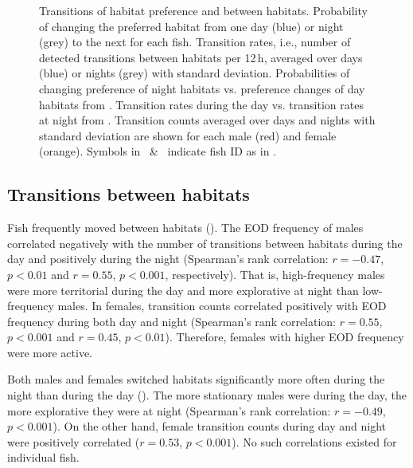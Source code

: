 \begin{figure*}[t]
  \caption{\label{transitions} Transitions of habitat preference and
    between habitats.  Probability of changing the
    preferred habitat from one day (blue) or night (grey) to the next
    for each fish.  Transition rates, i.e., number of
    detected transitions between habitats per 12\,h, averaged over
    days (blue) or nights (grey) with standard deviation.
     Probabilities of changing preference of night habitats
    vs. preference changes of day habitats from
    .  Transition rates during the day
    vs. transition rates at night from .  Transition
    counts averaged over days and nights with standard deviation are
    shown for each male (red) and female (orange). Symbols in
    ~\&~ indicate fish ID as in .}
\end{figure*}

\subsection{Transitions between habitats}
Fish frequently moved between habitats (). The EOD frequency of males correlated negatively with the number of transitions between habitats during the day and positively during the night (Spearman's rank correlation: $r=-0.47$, $p<0.01$ and $r=0.55$, $p<0.001$, respectively). That is, high-frequency males were more territorial during the day and more explorative at night than low-frequency males. In females, transition counts correlated positively with EOD frequency during both day and night (Spearman's rank correlation: $r=0.55$, $p<0.001$ and $r=0.45$, $p<0.01$). Therefore, females with higher EOD frequency were more active.

Both males and females switched habitats significantly more often during the night than during the day (). The more stationary males were during the day, the more explorative they were at night (Spearman's rank correlation: $r=-0.49$, $p<0.001$). On the other hand, female transition counts during day and night were positively correlated ($r=0.53$, $p<0.001$). No such correlations existed for individual fish.

